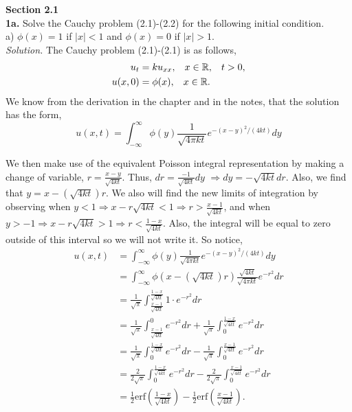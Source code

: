 \documentclass{article}
\begin{document}
\setlength{\parindent}{0cm}   %



\textbf{Section 2.1}
\\
\textbf{1a.} Solve the Cauchy problem (2.1)-(2.2) for the following initial condition. \\
a) \( \phi(x) = 1 \) if \( |x|<1 \) and \( \phi(x) =0 \) if \( |x| >1\).  \\

\vspace{3mm}
\textit{Solution.}  The Cauchy problem (2.1)-(2.1) is as follows, 
\begin{align*}
u_t &= ku_{xx},  \hspace{3mm} x \in \mathbb{R}, \hspace{3mm} t>0, \\
u(x,0) &= \phi(x), \hspace{3mm} x \in \mathbb{R}.
\end{align*}
We know from the derivation in the chapter and in the notes, that the solution has the form, 
\[ 
u(x,t) =  \int_{-\infty}^{\infty} \phi(y) \frac{1}{\sqrt{4\pi kt}} e^{-(x-y)^2/(4kt)} dy
\]

We then make use of the equivalent Poisson integral representation by making a change of variable, \(r = \frac{x-y}{\sqrt{4kt}} \). Thus, \(dr = \frac{-1}{\sqrt{4kt}} dy \) \( \Rightarrow dy = -\sqrt{4kt} dr \). Also, we find that \( y = x-(\sqrt{4kt})r \). We also will find the new limits of integration by observing when \(y<1 \Rightarrow x-r\sqrt{4kt}<1 \Rightarrow r> \frac{x-1}{\sqrt{4kt}} \), and when \(y>-1 \Rightarrow  x-r\sqrt{4kt}>1 \Rightarrow r< \frac{1-x}{\sqrt{4kt}} \). Also, the integral will be equal to zero outside of this interval so we will not write it. So notice, 
\begin{align*}
u(x,t) &= \int_{-\infty}^{\infty} \phi(y) \frac{1}{\sqrt{4\pi kt}} e^{-(x-y)^2/(4kt)} dy \\
&=  \int_{-\infty}^{\infty} \phi( x-(\sqrt{4kt})r) \frac{\sqrt{4kt}}{\sqrt{4\pi kt}} e^{-r^2} dr \\
&= \frac{1}{\sqrt{\pi}} \int_{\frac{x-1}{\sqrt{4kt}}}^{ \frac{1-x}{\sqrt{4kt}}} 1 \cdot e^{-r^2} dr \\
&= \frac{1}{\sqrt{\pi}} \int_{\frac{x-1}{\sqrt{4kt}}}^{0} e^{-r^2} dr + \frac{1}{\sqrt{\pi}} \int_{0}^{\frac{1-x}{\sqrt{4kt}}} e^{-r^2} dr \\
&=\frac{1}{\sqrt{\pi}} \int_{0}^{\frac{1-x}{\sqrt{4kt}}} e^{-r^2} dr - \frac{1}{\sqrt{\pi}} \int_{0}^{\frac{x-1}{\sqrt{4kt}}} e^{-r^2} dr \\
&= \frac{2}{2\sqrt{\pi}} \int_{0}^{\frac{1-x}{\sqrt{4kt}}} e^{-r^2} dr - \frac{2}{2\sqrt{\pi}} \int_{0}^{\frac{x-1}{\sqrt{4kt}}} e^{-r^2} dr \\
&= \frac{1}{2} \text{erf}\left(\frac{1-x}{\sqrt{4kt}}\right) - \frac{1}{2} \text{erf}\left(\frac{x-1}{\sqrt{4kt}}\right). 
\end{align*}
 
\end{document}
